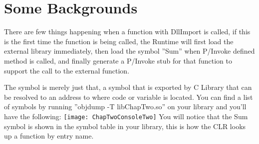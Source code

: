 \section{Some Backgrounds}
There are few things happening when a function with DllImport is called, if this is the first time the function is being called, the Runtime will first load the external library immediately, then load the symbol ''Sum'' when P/Invoke defined method is called, and finally generate a P/Invoke stub for that function to support the call to the external function.

The symbol is merely just that, a symbol that is exported by C Library that can be resolved to an address to where code or variable is located. You can find a list of symbols by running ''objdump -T libChapTwo.so'' on your library and you'll have the following:
\newline \newline
\texttt{[image: ChapTwoConsoleTwo]}
\newline\newline
You will notice that the Sum symbol is shown in the symbol table in your library, this is how the CLR looks up a function by entry name.